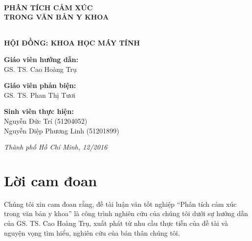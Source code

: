 \documentclass[a4paper, 12pt]{article}
\theoremstyle{definition}
\begin{document}
\begin{titlepage}
\HRule \\[0.4cm]
{ \huge \bfseries PHÂN TÍCH CẢM XÚC\\TRONG VĂN BẢN Y KHOA}\\[0.2cm] %
\HRule \\[0.8cm]

\begin{flushright}
\begin{minipage}{0.7\textwidth}

\end{minipage}
\end{flushright}

\begin{flushleft} \large
\textbf{HỘI ĐỒNG: KHOA HỌC MÁY TÍNH}\\[1.0cm]
\end{flushleft}

\begin{flushleft} \large
\textbf{Giáo viên hướng dẫn:}\\
GS. TS. Cao Hoàng Trụ\\[1.0cm]
\end{flushleft}

\begin{flushleft} \large
\textbf{Giáo viên phản biện:}\\
GS. TS. Phan Thị Tươi\\[1.0cm]
\end{flushleft}

\begin{flushleft} \large
\textbf{Sinh viên thực hiện:}\\
Nguyễn Đức Trí (51204052)\\
Nguyễn Diệp Phương Linh (51201899)\\[1.5cm]
\end{flushleft}

\large \emph{Thành phố Hồ Chí Minh, 12/2016}

\vfill %
\end{titlepage}

\pagebreak
\section*{Lời cam đoan}
Chúng tôi xin cam đoan rằng, đề tài luận văn tốt nghiệp ``Phân tích cảm xúc trong văn bản y khoa'' là công trình nghiên cứu của chúng tôi dưới sự hướng dẫn của GS. TS. Cao Hoàng Trụ, xuất phát từ nhu cầu thực tiễn của đề tài và nguyện vọng tìm hiểu, nghiên cứu của bản thân chúng tôi.\\
\end{document}
